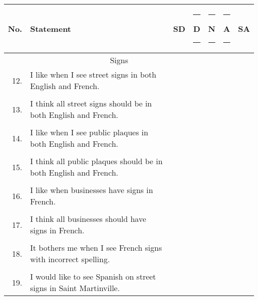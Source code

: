     \begin{longtable}[c]{| r p{} | c | c | c | c | c |}
      \hline
      No. & Statement                                                                 & SD & \rule{2.5pt}{0pt}D\rule{2.5pt}{0pt} & \rule{2.5pt}{0pt}N\rule{2.5pt}{0pt} & \rule{2.5pt}{0pt}A\rule{2.5pt}{0pt} & SA \\
      \hline
      \multicolumn{6}{c}{Signs} \\
      \hline
      12. & I like when I see street signs in both English and French.                & & & & & \\
          &                                                                           & & & & & \\
      \hline
      13. & I think all street signs should be in both English and French.            & & & & & \\
          &                                                                           & & & & & \\
      \hline
      14. & I like when I see public plaques in both English and French.              & & & & & \\
          &                                                                           & & & & & \\
      \hline
      15. & I think all public plaques should be in both English and French.          & & & & & \\
          &                                                                           & & & & & \\
      \hline
      16. & I like when businesses have signs in French.                              & & & & & \\
          &                                                                           & & & & & \\
      \hline
      17. & I think all businesses should have signs in French.                       & & & & & \\
          &                                                                           & & & & & \\
      \hline
      18. & It bothers me when I see French signs with incorrect spelling.            & & & & & \\
          &                                                                           & & & & & \\
      \hline
      19. & I would like to see Spanish on street signs in Saint Martinville.         & & & & & \\

\end{longtable}
